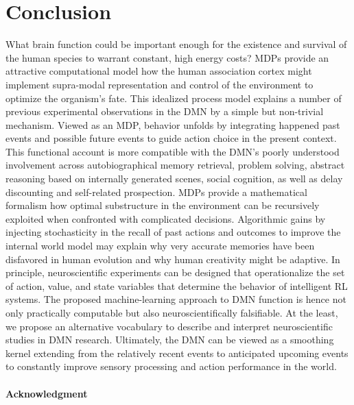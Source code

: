 \documentclass{article} %
\begin{document}
\section{Conclusion}
What brain function could be important enough
for the existence and survival of the human species
to warrant constant, high energy costs?
MDPs provide an attractive
computational model how the human association cortex
might implement supra-modal representation and control of the environment to
optimize the organism's fate.
This idealized process model explains
a number of previous experimental observations in the
DMN by a simple but non-trivial mechanism.
%
Viewed as an MDP, behavior unfolds by integrating happened past events
and possible future events to guide action choice in the present context.
This functional account is more compatible with the DMN's
poorly understood involvement across
autobiographical memory retrieval, problem solving,
abstract reasoning based on internally generated scenes, social cognition,
as well as delay discounting and self-related prospection.
MDPs provide a mathematical formalism how
optimal substructure in the environment can be recursively exploited
when confronted with complicated decisions.
Algorithmic gains by injecting stochasticity in the recall of past
actions and outcomes to improve the internal world model may explain why
very accurate memories have been disfavored in human evolution
and why human creativity might be adaptive.
%
In principle,
neuroscientific experiments can be designed that operationalize
the set of action, value, and state variables that determine
the behavior of intelligent RL systems.
The proposed machine-learning
approach to DMN function is hence not only practically computable but
also neuroscientifically falsifiable.
At the least, we propose an alternative vocabulary to
describe and interpret neuroscientific studies in DMN research.
%
Ultimately,
the DMN can be viewed as a smoothing kernel extending
from the relatively recent events to anticipated upcoming events
to constantly improve sensory processing and
action performance in the world.



\paragraph{Acknowledgment}


\small
% 
% 


\end{document}
